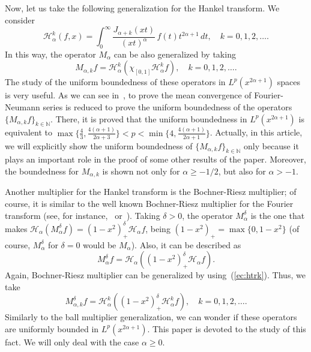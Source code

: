 \documentclass{amsart}
\theoremstyle{remark}
\newcommand{\N}{\mathbb{N}}
\newcommand{\htr}{\mathcal{H}_{\alpha}}
\newcommand{\htrk}{\mathcal{H}_{\alpha}^{k}}
\newcommand{\ma}{M_{\alpha}}
\newcommand{\mak}{M_{\alpha,k}}
\newcommand{\BR}{M_\alpha^{\delta}}
\newcommand{\BRk}{M_{\alpha,k}^{\delta}}
\begin{document}
Now, let us take the following generalization for the Hankel transform. We
consider
\begin{equation}
\label{ec:htrk}
    \htrk(f,x) = \int_0^\infty \frac{J_{\alpha+k}(xt)}{(xt)^\alpha} \, f(t)
      t^{2\alpha+1} \, dt,
    \quad k = 0,1,2,\dots.
\end{equation}
In this way, the operator $\ma$ can be also generalized by taking
\begin{equation}
\label{ec:mak}
    \mak f = \htrk(\chi_{[0,1]}\htrk f),
    \quad k = 0,1,2,\dots.
\end{equation}
The study of the uniform boundedness of these operators in
$L^p(x^{2\alpha+1})$ spaces is very useful. As we can see
in~\cite{Var,GPV-Con,CGPV-FN}, to prove the mean convergence
of Fourier-Neumann series is reduced to prove the uniform boundedness of
the operators $\{\mak f\}_{k\in\N}$. There, it is proved
that the uniform boundedness in $L^p(x^{2\alpha+1})$ is equivalent to
$\max\{\frac43,\frac{4(\alpha+1)}{2\alpha+3}\} < p <
\min\{4,\frac{4(\alpha+1)}{2\alpha+1}\}$.
Actually, in this article, we will explicitly show the uniform
boundedness of $\{\mak f\}_{k\in\N}$ only because it plays an important role
in the proof of some other results of the paper. Moreover, the boundedness for
$\mak$ is shown not only for $\alpha\ge-1/2$, but also for $\alpha>-1$.

Another multiplier for the Hankel transform is the Bochner-Riesz multiplier;
of course, it is similar to the well known Bochner-Riesz multiplier for the
Fourier transform (see, for instance,~\cite{Well,RF} or~\cite[Ch.~IX,
\S~2.2]{St-HA}). Taking $\delta>0$, the operator $\BR$ is the one that
makes $\htr(\BR f) = (1-x^2)^{\delta}_+ \htr f$,
being $(1-x^2)_+ = \max\{0,1-x^2\}$ (of course, $\BR$ for $\delta=0$ would be
$\ma$). Also, it can be described as
\begin{equation}
\label{ec:BR}
    \BR f = \htr \left( (1-x^2)^{\delta}_+ \htr f \right).
\end{equation}
Again, Bochner-Riesz multiplier can be generalized
by using~(\ref{ec:htrk}). Thus, we take
\begin{equation}
\label{ec:BRk}
    \BRk f = \htrk \left( (1-x^2)^{\delta}_+ \htrk f \right),
    \quad k = 0,1,2,\dots.
\end{equation}
Similarly to the ball multiplier generalization, we can wonder if these
operators are uniformly bounded in $L^p(x^{2\alpha+1})$. This paper is
devoted to the study of this fact. We will only deal with the case $\alpha \ge
0$.
\end{document}
